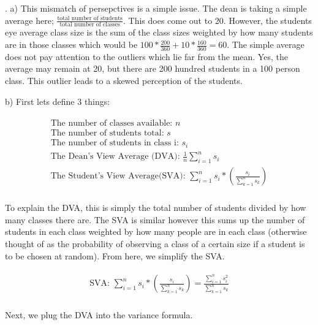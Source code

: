\documentclass[11pt]{article}
\begin{document}
. 
\smallskip
    a) This mismatch of persepctives is a simple issue.  The dean is taking a simple average here; 
    $\frac{ \text{total number of students}}{\text{total number of classes}}$.  This does come out to 20.   However, the students eye average class size is the sum of the class sizes weighted by how many students are in those classes which would be $100*\frac{200}{360} + 10*\frac{160}{360} = 60$.  The simple average does not pay attention to the outliers which lie far from the mean. Yes, the average may remain at 20, but there are 200 hundred students in a 100 person class.  This outlier leads to a skewed perception of the students. 
\bigskip

    b) First lets define 3 things:

    \begin{gather*}
    \begin{align}
    \text{The number of classes available:  }n\\
    \text{The number of students total:  }s\\
    \text{The number of students in class i:  }s_i\\
    \text{The Dean's View Average (DVA):  }\frac{1}{n} \sum\limits_{i=1}^n s_i \\
    \text{The Student's View Average(SVA):  } \sum\limits_{i=1}^n s_i*(\frac{s_i}{\sum\limits_{k=1}^n s_k })\\
    \end{align}
    \end{gather*}

    To explain the DVA, this is simply the total number of students divided by how many classes there are.  The SVA is similar however this sums up the number of students in each class weighted by how many people are in each class (otherwise thought of as the probability of observing a class of a certain size if a student is to be chosen at random).  From here, we simplify the SVA.

    \begin{gather*}
    \begin{align}
    \text{SVA:  } \sum\limits_{i=1}^n s_i*(\frac{s_i}{\sum\limits_{k=1}^n s_k }) = \frac{\sum\limits_{i=1}^n s_i^2}{\sum\limits_{k=1}^n s_k }\\
    \end{align}
    \end{gather*}

    Next, we plug the DVA into the variance formula.
\end{document}
